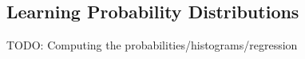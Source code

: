 


\subsection{Learning Probability Distributions}

TODO: Computing the probabilities/histograms/regression
